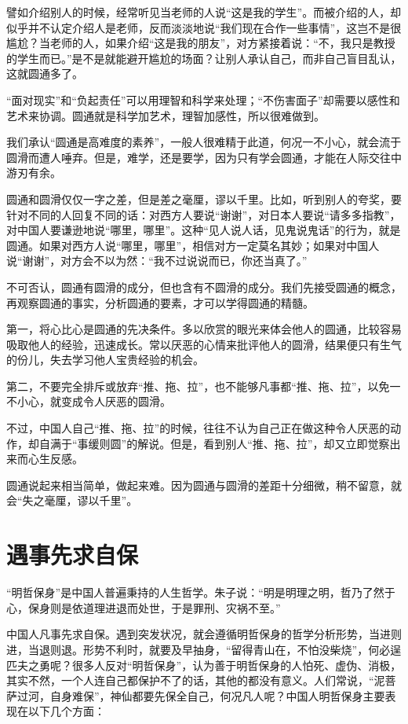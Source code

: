 \documentclass[fontset=fandol, a4paper, 12pt, openright]{ctexbook}
\begin{document}
譬如介绍别人的时候，经常听见当老师的人说“这是我的学生”。而被介绍的人，却似乎并不认定介绍人是老师，反而淡淡地说“我们现在合作一些事情”，这岂不是很尴尬？当老师的人，如果介绍“这是我的朋友”，对方紧接着说：“不，我只是教授的学生而已。”是不是就能避开尴尬的场面？让别人承认自己，而非自己盲目乱认，这就圆通多了。

“面对现实”和“负起责任”可以用理智和科学来处理；“不伤害面子”却需要以感性和艺术来协调。圆通就是科学加艺术，理智加感性，所以很难做到。

我们承认“圆通是高难度的素养”，一般人很难精于此道，何况一不小心，就会流于圆滑而遭人唾弃。但是，难学，还是要学，因为只有学会圆通，才能在人际交往中游刃有余。

圆通和圆滑仅仅一字之差，但是差之毫厘，谬以千里。比如，听到别人的夸奖，要针对不同的人回复不同的话：对西方人要说“谢谢”，对日本人要说“请多多指教”，对中国人要谦逊地说“哪里，哪里”。这种“见人说人话，见鬼说鬼话”的行为，就是圆通。如果对西方人说“哪里，哪里”，相信对方一定莫名其妙；如果对中国人说“谢谢”，对方会不以为然：“我不过说说而已，你还当真了。”

不可否认，圆通有圆滑的成分，但也含有不圆滑的成分。我们先接受圆通的概念，再观察圆通的事实，分析圆通的要素，才可以学得圆通的精髓。

第一，将心比心是圆通的先决条件。多以欣赏的眼光来体会他人的圆通，比较容易吸取他人的经验，迅速成长。常以厌恶的心情来批评他人的圆滑，结果便只有生气的份儿，失去学习他人宝贵经验的机会。

第二，不要完全排斥或放弃“推、拖、拉”，也不能够凡事都“推、拖、拉”，以免一不小心，就变成令人厌恶的圆滑。

不过，中国人自己“推、拖、拉”的时候，往往不认为自己正在做这种令人厌恶的动作，却自满于“事缓则圆”的解说。但是，看到别人“推、拖、拉”，却又立即觉察出来而心生反感。

圆通说起来相当简单，做起来难。因为圆通与圆滑的差距十分细微，稍不留意，就会“失之毫厘，谬以千里”。

\section{遇事先求自保}

“明哲保身”是中国人普遍秉持的人生哲学。朱子说：“明是明理之明，哲乃了然于心，保身则是依道理进退而处世，于是罪刑、灾祸不至。”

中国人凡事先求自保。遇到突发状况，就会遵循明哲保身的哲学分析形势，当进则进，当退则退。形势不利时，就要及早抽身，“留得青山在，不怕没柴烧”，何必逞匹夫之勇呢？很多人反对“明哲保身”，认为善于明哲保身的人怕死、虚伪、消极，其实不然，一个人连自己都保护不了的话，其他的都没有意义。人们常说，“泥菩萨过河，自身难保”，神仙都要先保全自己，何况凡人呢？中国人明哲保身主要表现在以下几个方面：
\end{document}
